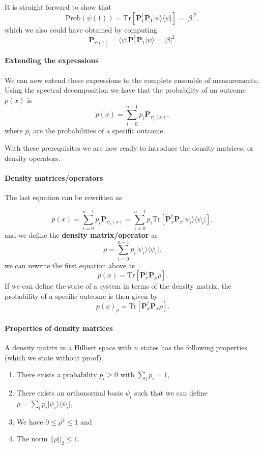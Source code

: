 It is straight forward to show that
\[
\mathrm{Prob}(\psi(1))=\mathrm{Tr}\left[\bm{P}_1^{\dagger}\bm{P}_1\vert \psi\rangle\langle \psi\vert\right]=\vert \beta\vert^2,
\]
which we also could have obtained by computing
\[
\bm{P}_{\psi(1)}=\langle \psi\vert \bm{P}_1^{\dagger}\bm{P}_1\vert \psi\rangle=\vert \beta\vert^2.
\]


\paragraph{Extending the expressions}

We can now extend these expressions to the complete ensemble of measurements. Using the spectral decomposition we have that the probability of an outcome $p(x)$ is
\[
p(x)=\sum_{i=0}^{n-1}p_i\bm{P}_{\psi_i(x)},
\]
where $p_i$ are the probabilities of a specific outcome. 

With these prerequisites we are now ready to introduce the density  matrices, or density operators.


\paragraph{Density matrices/operators}

The last equation can be rewritten as 

\[
p(x)=\sum_{i=0}^{n-1}p_i\bm{P}_{\psi_i(x)}=\sum_{i=0}^{n-1}p_i\mathrm{Tr}\left[\bm{P}_x^{\dagger}\bm{P}_x\vert \psi_i\rangle\langle \psi_i\vert\right],
\]
and we define the \textbf{density matrix/operator} as
\[
\rho=\sum_{i=0}^{n-1}p_i\vert \psi_i\rangle\langle \psi_i\vert,
\]
we can rewrite the first equation above as 
\[
p(x)=\mathrm{Tr}\left[\bm{P}_x^{\dagger}\bm{P}_x\rho\right].
\]
If we can define the state of a system in terms of the density matrix, the probability of a specific outcome is then given by
\[
p(x)_{\rho}=\mathrm{Tr}\left[\bm{P}_x^{\dagger}\bm{P}_x\rho\right].
\]


\paragraph{Properties of density matrices}

A density matrix in a Hilbert space with $n$ states has the following properties (which we state without proof)
\begin{enumerate}
\item There exists a probability $p_i\geq 0$ with $\sum_ip_i=1$,

\item There exists an orthonormal basis $\psi_i$ such that we can define $\rho=\sum_ip_i\vert\psi_i\rangle\langle \psi_i\vert$,

\item We have $0 \leq \rho^2\leq 1$ and

\item The norm $\vert\vert \rho \vert\vert_2\leq 1$.
\end{enumerate}


